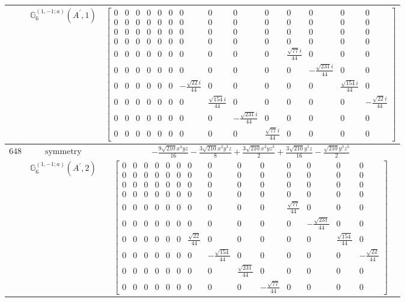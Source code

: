 \documentclass[fleqn,8pt,landscape]{jsarticle}
\begin{document}
\begin{longtable}{ccc}
$  $ & $ \mathbb{G}_{6}^{(1,-1;a)}(A^{\prime},1) $ & $ \begin{bmatrix} 0 & 0 & 0 & 0 & 0 & 0 & 0 & 0 & 0 & 0 & 0 & 0 & 0 & 0 \\ 0 & 0 & 0 & 0 & 0 & 0 & 0 & 0 & 0 & 0 & 0 & 0 & 0 & 0 \\ 0 & 0 & 0 & 0 & 0 & 0 & 0 & 0 & 0 & 0 & 0 & 0 & 0 & 0 \\ 0 & 0 & 0 & 0 & 0 & 0 & 0 & 0 & 0 & 0 & 0 & 0 & 0 & 0 \\ 0 & 0 & 0 & 0 & 0 & 0 & 0 & 0 & 0 & 0 & \frac{\sqrt{77} i}{44} & 0 & 0 & 0 \\ 0 & 0 & 0 & 0 & 0 & 0 & 0 & 0 & 0 & 0 & 0 & - \frac{\sqrt{231} i}{44} & 0 & 0 \\ 0 & 0 & 0 & 0 & 0 & 0 & - \frac{\sqrt{22} i}{44} & 0 & 0 & 0 & 0 & 0 & \frac{\sqrt{154} i}{44} & 0 \\ 0 & 0 & 0 & 0 & 0 & 0 & 0 & \frac{\sqrt{154} i}{44} & 0 & 0 & 0 & 0 & 0 & - \frac{\sqrt{22} i}{44} \\ 0 & 0 & 0 & 0 & 0 & 0 & 0 & 0 & - \frac{\sqrt{231} i}{44} & 0 & 0 & 0 & 0 & 0 \\ 0 & 0 & 0 & 0 & 0 & 0 & 0 & 0 & 0 & \frac{\sqrt{77} i}{44} & 0 & 0 & 0 & 0 \end{bmatrix} $ \\ \hline
$ 648 $ & $ \text{symmetry} $ & $ - \frac{9 \sqrt{210} x^{4} y z}{16} - \frac{3 \sqrt{210} x^{2} y^{3} z}{8} + \frac{3 \sqrt{210} x^{2} y z^{3}}{2} + \frac{3 \sqrt{210} y^{5} z}{16} - \frac{\sqrt{210} y^{3} z^{3}}{2} $ \\
$  $ & $ \mathbb{G}_{6}^{(1,-1;a)}(A^{\prime},2) $ & $ \begin{bmatrix} 0 & 0 & 0 & 0 & 0 & 0 & 0 & 0 & 0 & 0 & 0 & 0 & 0 & 0 \\ 0 & 0 & 0 & 0 & 0 & 0 & 0 & 0 & 0 & 0 & 0 & 0 & 0 & 0 \\ 0 & 0 & 0 & 0 & 0 & 0 & 0 & 0 & 0 & 0 & 0 & 0 & 0 & 0 \\ 0 & 0 & 0 & 0 & 0 & 0 & 0 & 0 & 0 & 0 & 0 & 0 & 0 & 0 \\ 0 & 0 & 0 & 0 & 0 & 0 & 0 & 0 & 0 & 0 & \frac{\sqrt{77}}{44} & 0 & 0 & 0 \\ 0 & 0 & 0 & 0 & 0 & 0 & 0 & 0 & 0 & 0 & 0 & - \frac{\sqrt{231}}{44} & 0 & 0 \\ 0 & 0 & 0 & 0 & 0 & 0 & \frac{\sqrt{22}}{44} & 0 & 0 & 0 & 0 & 0 & \frac{\sqrt{154}}{44} & 0 \\ 0 & 0 & 0 & 0 & 0 & 0 & 0 & - \frac{\sqrt{154}}{44} & 0 & 0 & 0 & 0 & 0 & - \frac{\sqrt{22}}{44} \\ 0 & 0 & 0 & 0 & 0 & 0 & 0 & 0 & \frac{\sqrt{231}}{44} & 0 & 0 & 0 & 0 & 0 \\ 0 & 0 & 0 & 0 & 0 & 0 & 0 & 0 & 0 & - \frac{\sqrt{77}}{44} & 0 & 0 & 0 & 0 \end{bmatrix} $ \\ \hline

\end{longtable}
\end{document}
